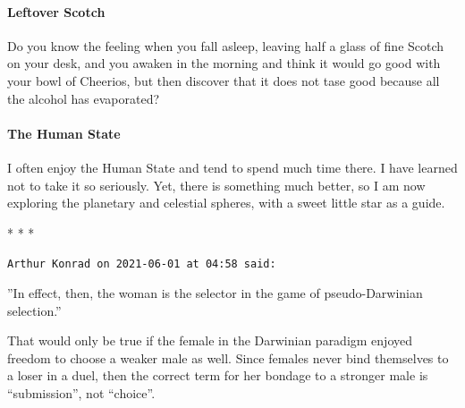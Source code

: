 \paragraph{Leftover Scotch} Do you know the feeling when you fall asleep, leaving half a glass of fine Scotch on your desk, and you awaken in the morning and think it would go good with your bowl of Cheerios, but then discover that it does not tase good because all the alcohol has evaporated?

\paragraph{The Human State} I often enjoy the Human State and tend to spend much time there. I have learned not to take it so seriously. Yet, there is something much better, so I am now exploring the planetary and celestial spheres, with a sweet little star as a guide.


\begin{center}* * *\end{center}

\begin{footnotesize}
\begin{sffamily}
\texttt{Arthur Konrad on 2021-06-01 at 04:58 said:}

''In effect, then, the woman is the selector in the game of pseudo-Darwinian selection.''

That would only be true if the female in the Darwinian paradigm enjoyed freedom to choose a weaker male as well. Since females never bind themselves to a loser in a duel, then the correct term for her bondage to a stronger male is ``submission'', not ``choice''.

\end{sffamily}
\end{footnotesize}

